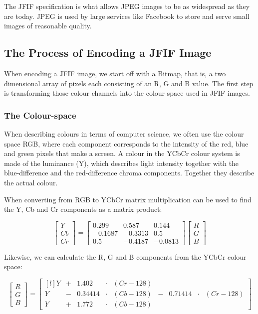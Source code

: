 \begin{infobox}
The JFIF specification is what allows JPEG images to be as widespread as they are today.
JPEG is used by large services like Facebook to store and serve small images of reasonable quality.

\vspace{4mm}
\subsection{The Process of Encoding a JFIF Image}
\vspace{-2.5mm}
When encoding a JFIF image, we start off with a Bitmap, that is, a two dimensional array of pixels each consisting of an R, G and B value. The first step is transforming those colour channels into the colour space used in JFIF images. 

\vspace{4mm}
\subsubsection{The Colour-space}
\vspace{-2.5mm}
When describing colours in terms of computer science, we often use the colour space RGB, where each component corresponds to the intensity of the red, blue and green pixels that make a screen. 
A colour in the YCbCr colour system is made of the luminance (Y), which describes light intensity together with the blue-difference and the red-difference chroma components.
Together they describe the actual colour.

When converting from RGB to YCbCr matrix multiplication can be used to find the Y, Cb and Cr components as a matrix product:

$$\begin{bmatrix}
	Y\\Cb\\Cr
\end{bmatrix} = \begin{bmatrix}
	0.299 & 0.587 & 0.144\\
	-0.1687 & -0.3313 & 0.5\\
	0.5 & -0.4187 & -0.0813
\end{bmatrix}\begin{bmatrix}
	R\\G\\B
\end{bmatrix}$$

Likewise, we can calculate the R, G and B components from the YCbCr colour space:

$$\begin{bmatrix}
	R\\G\\B
\end{bmatrix} = \begin{bmatrix*}[l]
	Y&+&1.402 &\cdot & (Cr-128)&\\
	Y &-& 0.34414&\cdot &(Cb-128) &- &0.71414&\cdot&(Cr-128)\\
	Y &+& 1.772&\cdot& (Cb-128)&
\end{bmatrix*}$$


\end{infobox}
